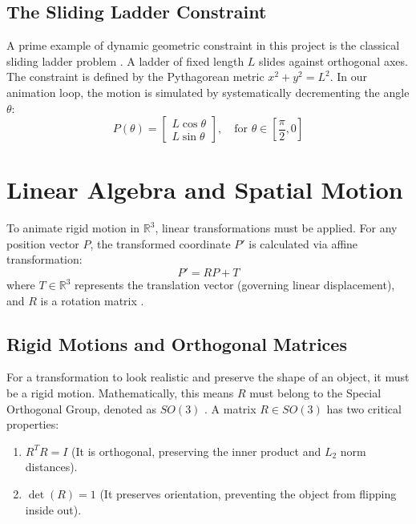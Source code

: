\documentclass[12pt, a4paper]{report}
\begin{document}
\subsection{The Sliding Ladder Constraint}
A prime example of dynamic geometric constraint in this project is the classical sliding ladder problem \cite{loney1895}. A ladder of fixed length $L$ slides against orthogonal axes. The constraint is defined by the Pythagorean metric $x^2 + y^2 = L^2$. In our animation loop, the motion is simulated by systematically decrementing the angle $\theta$:
\begin{equation}
    P(\theta) = \begin{bmatrix} L \cos\theta \\ L \sin\theta \end{bmatrix}, \quad \text{for } \theta \in \left[\frac{\pi}{2}, 0\right]
\end{equation}

\section{Linear Algebra and Spatial Motion}
To animate rigid motion in $\mathbb{R}^3$, linear transformations must be applied. For any position vector $P$, the transformed coordinate $P'$ is calculated via affine transformation:
\begin{equation}
    P' = R P + T
\end{equation}
where $T \in \mathbb{R}^3$ represents the translation vector (governing linear displacement), and $R$ is a rotation matrix \cite{friedberg2019}. 

\subsection{Rigid Motions and Orthogonal Matrices}
For a transformation to look realistic and preserve the shape of an object, it must be a rigid motion. Mathematically, this means $R$ must belong to the Special Orthogonal Group, denoted as $SO(3)$ \cite{friedberg2019}. A matrix $R \in SO(3)$ has two critical properties:
\begin{enumerate}
    \item $R^T R = I$ (It is orthogonal, preserving the inner product and $L_2$ norm distances).
    \item $\det(R) = 1$ (It preserves orientation, preventing the object from flipping inside out).
\end{enumerate}
\end{document}
